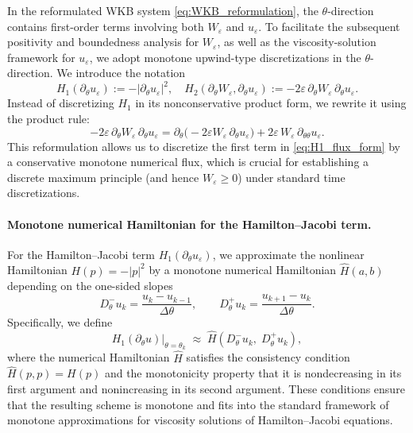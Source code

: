 \documentclass[11pt, dina4, amsfont12]{article}
\begin{document}
In the reformulated WKB system \eqref{eq:WKB_reformulation}, the
$\theta$-direction contains first-order terms involving both
$W_\varepsilon$ and $u_\varepsilon$.
To facilitate the subsequent positivity and boundedness analysis for
$W_\varepsilon$, as well as the viscosity-solution framework for
$u_\varepsilon$, we adopt monotone upwind-type discretizations in the
$\theta$-direction.
We introduce the notation
\[
H_1(\partial_\theta u_\varepsilon)
:= -|\partial_\theta u_\varepsilon|^2,
\quad
H_2(\partial_\theta W_\varepsilon,\partial_\theta u_\varepsilon)
:= -2\varepsilon\,\partial_\theta W_\varepsilon\,\partial_\theta u_\varepsilon.
\]
Instead of discretizing $H_1$ in its nonconservative product form, we rewrite it
using the product rule:
\begin{equation}\label{eq:H1_flux_form}
-2\varepsilon\, \partial_\theta W_\varepsilon\, \partial_\theta u_\varepsilon
=
\partial_\theta\!\bigl(-2\varepsilon W_\varepsilon\,\partial_\theta u_\varepsilon\bigr)
+ 2\varepsilon\, W_\varepsilon\, \partial_{\theta\theta}u_\varepsilon .
\end{equation}
This reformulation allows us to discretize the first term in
\eqref{eq:H1_flux_form} by a conservative monotone numerical flux, which is
crucial for establishing a discrete maximum principle (and hence
$W_\varepsilon\ge 0$) under standard time discretizations.

\paragraph{Monotone numerical Hamiltonian for the Hamilton--Jacobi term.}
For the Hamilton--Jacobi term $H_1(\partial_\theta u_\varepsilon)$, we approximate
the nonlinear Hamiltonian $H(p)=-|p|^2$ by a monotone numerical Hamiltonian
$\widehat{H}(a,b)$ depending on the one-sided slopes
\[
D_\theta^- u_k=\frac{u_k-u_{k-1}}{\Delta\theta},
\qquad
D_\theta^+ u_k=\frac{u_{k+1}-u_k}{\Delta\theta}.
\]
Specifically, we define
\[
H_1(\partial_\theta u)\Big|_{\theta=\theta_k}
\;\approx\;
\hat{H} \!\left(D_\theta^- u_k,\; D_\theta^+ u_k\right),
\]
where the numerical Hamiltonian $\widehat{H}$ satisfies the consistency
condition $\widehat{H}(p,p)=H(p)$ and the monotonicity property that it
is nondecreasing in its first argument and nonincreasing in its second argument.
These conditions ensure that the resulting scheme is monotone and fits into the
standard framework of monotone approximations for viscosity solutions of
Hamilton--Jacobi equations.
\end{document}
